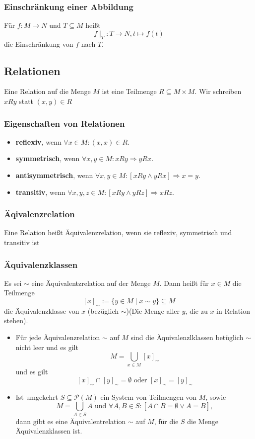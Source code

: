 \documentclass{kit}
\begin{document}
    \subsubsection{Einschränkung einer Abbildung}
      Für $f:M\longrightarrow N$ und $T\subseteq M$ heißt
      \[f\mid_T:T\longrightarrow N, t\mapsto f(t)\]
      die Einschränkung von $f$ nach $T$.
  \subsection{Relationen}
    Eine Relation auf die Menge $M$ ist eine Teilmenge $R\subseteq M\times M$. Wir schreiben $xRy$ statt $(x,y)\in R$
    \subsubsection{Eigenschaften von Relationen}
      \begin{itemize}
        \item \textbf{reflexiv}, wenn $\forall x\in M:(x,x)\in R$.
        \item \textbf{symmetrisch}, wenn $\forall x,y\in M:xRy\Rightarrow yRx$.
        \item \textbf{antisymmetrisch}, wenn $\forall x,y\in M:[xRy\land yRx]\Rightarrow x=y$.
        \item \textbf{transitiv}, wenn $\forall x,y,z\in M:[xRy\land yRz]\Rightarrow xRz$.
      \end{itemize}
    \subsubsection{Äqivalenzrelation}
      Eine Relation heißt Äquivalenzrelation, wenn sie reflexiv, symmetrisch und transitiv ist
    \subsubsection{Äquivalenzklassen}
      Es sei $\sim$ eine Äquivalentzrelation auf der Menge $M$. Dann heißt für $x\in M$ die Teilmenge
      \[[x]_\sim:=\{y\in M\mid x\sim y\}\subseteq M\]
      die Äquivalenzklasse von $x$ (bezüglich $\sim$)\footnotesize{(Die Menge aller $y$, die zu $x$ in Relation stehen)}.
      \begin{itemize}
        \item Für jede Äquivalenzrelation $\sim$ auf $M$ sind die Äquivalenzlklassen betüglich $\sim$ nicht leer und es gilt
          \[M=\bigcup_{x\in M}[x]_\sim\]
          und es gilt
          \[[x]_\sim\cap[y]_\sim=\emptyset\text{ oder }[x]_\sim=[y]_\sim\]
        \item Ist umgekehrt $S\subseteq\mathcal{P}(M)$ ein System von Teilmengen von $M$, sowie
          \[M=\bigcup_{A\in S}A\text{ und }\forall A,B\in S:[A\cap B=\emptyset\lor A=B],\]
          dann gibt es eine Äquivalentrelation $\sim$ auf $M$, für die $S$ die Menge Äquivalenzklassen ist.
      \end{itemize}
\end{document}
